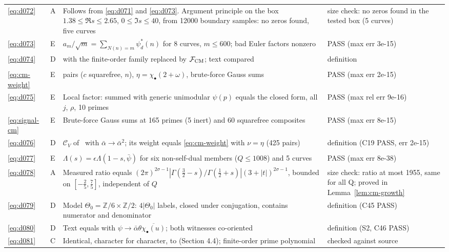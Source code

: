 \documentclass[11pt]{article}
\numberwithin{equation}{section}
\begin{document}
\begin{longtable}{@{}>{\raggedright\arraybackslash}p{1.2cm}>{\centering\arraybackslash}p{0.7cm}>{\raggedright\arraybackslash}p{9.05cm}>{\raggedright\arraybackslash}p{4.3cm}@{}}
\eqref{eq:d072} & A & Follows from \eqref{eq:d071} and \eqref{eq:d073}. Argument principle on the box $1.38\le\Re s\le2.65$, $0\le\Im s\le40$, from 12000 boundary samples: no zeros found, five curves & size check: no zeros found in the tested box (5 curves)\\
\eqref{eq:d073} & E & $a_m/\sqrt m=\sum_{N(n)=m}\psi_d^*(n)$ for 8 curves, $m\le600$; bad Euler factors nonzero & PASS (max err 3e-15)\\
\eqref{eq:d074} & D & \cite[eq.~(2.1)]{OAI78} with the finite-order family replaced by $\mathcal F_{\rm CM}$; text compared & definition\\
\multicolumn{4}{@{}l}{\emph{Section~12}}\\
\eqref{eq:cm-weight} & E & 425 pairs ($c$ squarefree, $n$), $\eta=\chi_\bullet(2+\omega)$, brute-force Gauss sums & PASS (max err 2e-15)\\
\eqref{eq:d075} & E & Local factor: \cite[eq.~(7.10)]{OAI78} summed with generic unimodular $\psi(p)$ equals the closed form, all $j$, $\rho$, 10 primes & PASS (max rel err 9e-16)\\
\eqref{eq:signal-cm} & E & Brute-force Gauss sums at 165 primes (5 inert) and 60 squarefree composites & PASS (max err 8e-15)\\
\eqref{eq:d076} & D & $\mathcal C_V$ of~\cite{OAI78} with $\bar\alpha\to\bar\alpha^2$; its weight equals \eqref{eq:cm-weight} with $\nu=\eta$ (425 pairs) & definition (C19 PASS, err 2e-15)\\
\multicolumn{4}{@{}l}{\emph{Section~13}}\\
\eqref{eq:d077} & E & $\Lambda(s)=\epsilon\Lambda(1-s,\bar\psi)$ for six non-self-dual members ($Q\le1008$) and 5 curves & PASS (max err 8e-38)\\
\eqref{eq:d078} & A & Measured ratio equals $(2\pi)^{2\sigma-1}|\Gamma(\frac32-s)/\Gamma(\frac12+s)|(3+|t|)^{2\sigma-1}$, bounded on $[-\frac25,\frac75]$, independent of $Q$ & size check: ratio at most 1955, same for all Q; proved in Lemma~\ref{lem:cm-growth}\\
\eqref{eq:d079} & D & Model $\Theta_0=\mathbb Z/6\times\mathbb Z/2$: $4|\Theta_0|$ labels, closed under conjugation, contains numerator and denominator & definition (C45 PASS)\\
\eqref{eq:d080} & D & Text equals \cite[eq.~(8)]{G78} with $\psi\to\bar\alpha\theta\overline{\chi_\bullet(u)}$; both witnesses co-oriented & definition (S2, C46 PASS)\\
\eqref{eq:d081} & C & Identical, character for character, to \cite[eq.~(11)]{G78} (Section 4.4); finite-order prime polynomial & checked against source\\

\end{longtable}
\end{document}
